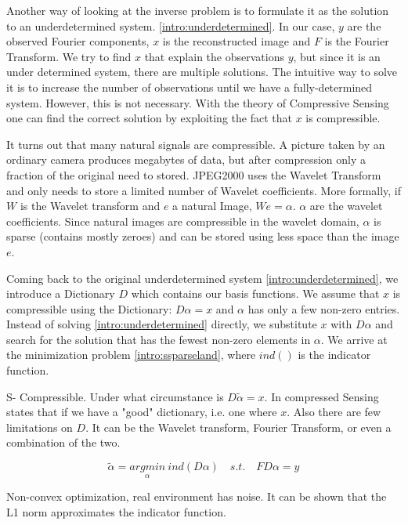 Another way of looking at the inverse problem is to formulate it as the solution to an underdetermined system. \eqref{intro:underdetermined}. In our case, $y$ are the observed Fourier components, $x$ is the reconstructed image and $F$ is the Fourier Transform. We try to find $x$ that explain the observations $y$, but since it is an under determined system, there are multiple solutions. The intuitive way to solve it is to increase the number of observations until we have a fully-determined system. However, this is not necessary. With the theory of Compressive Sensing one can find the correct solution by exploiting the fact that $x$ is compressible.

It turns out that many natural signals are compressible. A picture taken by an ordinary camera produces megabytes of data, but after compression only a fraction of the original need to stored. JPEG2000 uses the Wavelet Transform and only needs to store a limited number of Wavelet coefficients. More formally, if $W$ is the Wavelet transform and $e$ a natural Image, $We = \alpha$. $\alpha$ are the wavelet coefficients. Since natural images are compressible in the wavelet domain, $\alpha$ is sparse (contains mostly zeroes) and can be stored using less space than the image $e$.

Coming back to the original underdetermined system \eqref{intro:underdetermined}, we introduce a Dictionary $D$ which contains our basis functions. We assume that $x$ is compressible using the Dictionary: $D\alpha = x$ and $\alpha$ has only a few non-zero entries. Instead of solving \eqref{intro:underdetermined} directly, we substitute $x$ with $D\alpha$ and search for the solution that has the fewest non-zero elements in $\alpha$. We arrive at the minimization problem \eqref{intro:ssparseland}, where $\mathit{ind}()$ is the indicator function. 

S- Compressible. Under what circumstance is $D\tilde{\alpha} = x$. In compressed Sensing states that if we have a "good" dictionary, i.e. one where $x$. Also there are few limitations on $D$. It can be the Wavelet transform, Fourier Transform, or even a combination of the two.

\begin{equation}\label{intro:ssparseland}
\tilde{\alpha} =  \underset{\alpha}{arg min} \: \mathit{ind}(D\alpha) \quad s. t. \quad FD\alpha = y
\end{equation}

Non-convex optimization, real environment has noise. It can be shown that the L1 norm approximates the indicator function.

